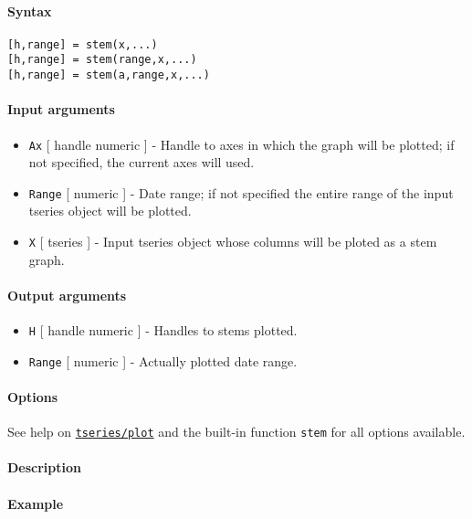 


	\paragraph{Syntax}\label{syntax}

\begin{verbatim}
[h,range] = stem(x,...)
[h,range] = stem(range,x,...)
[h,range] = stem(a,range,x,...)
\end{verbatim}

\paragraph{Input arguments}\label{input-arguments}

\begin{itemize}
\item
  \texttt{Ax} {[} handle \textbar{} numeric {]} - Handle to axes in
  which the graph will be plotted; if not specified, the current axes
  will used.
\item
  \texttt{Range} {[} numeric {]} - Date range; if not specified the
  entire range of the input tseries object will be plotted.
\item
  \texttt{X} {[} tseries {]} - Input tseries object whose columns will
  be ploted as a stem graph.
\end{itemize}

\paragraph{Output arguments}\label{output-arguments}

\begin{itemize}
\item
  \texttt{H} {[} handle \textbar{} numeric {]} - Handles to stems
  plotted.
\item
  \texttt{Range} {[} numeric {]} - Actually plotted date range.
\end{itemize}

\paragraph{Options}\label{options}

See help on \href{tseries/plot}{\texttt{tseries/plot}} and the built-in
function \texttt{stem} for all options available.

\paragraph{Description}\label{description}

\paragraph{Example}\label{example}


